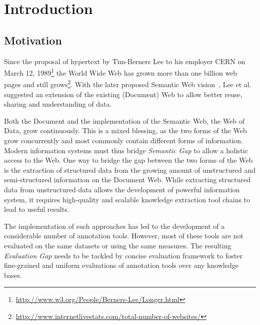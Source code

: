\chapter{Introduction}
\section*{Motivation}

Since the proposal of hypertext by Tim-Berners Lee to his employer CERN on March 12, 1989\footnote{\url{http://www.w3.org/People/Berners-Lee/Longer.html}} the World Wide Web has grown more than one billion web pages and still grows\footnote{\url{http://www.internetlivestats.com/total-number-of-websites/}}.
With the later proposed Semantic Web vision~\cite{bernerslee2001semantic}, Lee et al. suggested an extension of the existing (Document) Web to allow better reuse, sharing and understanding of data.

Both the Document and the implementation of the Semantic Web, the Web of Data, grow continuously. 
This is a mixed blessing, as the two forms of the Web grow concurrently and most commonly contain different forms of information. 
Modern information systems must thus bridge \emph{Semantic Gap} to allow a holistic access to the Web. 
One way to bridge the gap between the two forms of the Web is the extraction of structured data from the growing amount of unstructured and semi-structured information on the Document Web. 
While extracting structured data from unstructured data allows the development of powerful information system, it requires high-quality and scalable knowledge extraction tool chains to lead to useful results. 

The implementation of such approaches has led to the development of a considerable number of annotation tools. 
However, most of these tools are not evaluated on the same datasets or using the same measures.
The resulting \emph{Evaluation Gap} needs to be tackled by concise evaluation framework to foster fine-grained and uniform evaluations of annotation tools over any knowledge bases.

